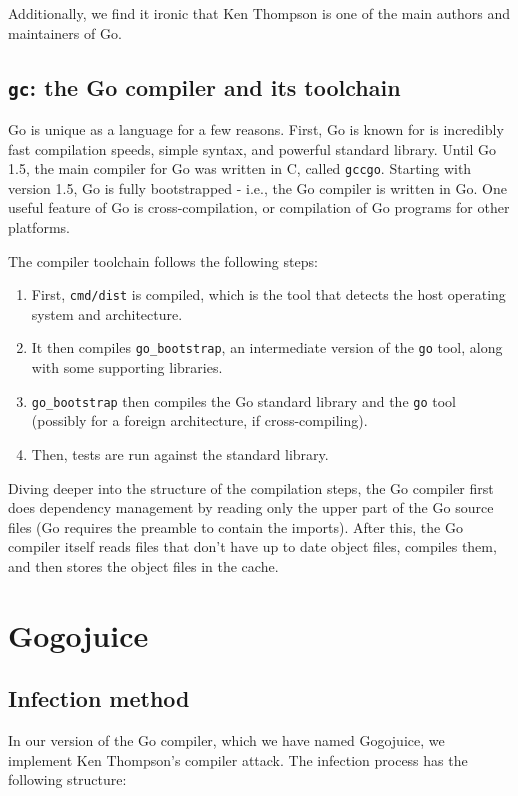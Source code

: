 \documentclass[10pt]{sigplanconf}
\begin{document}
Additionally, we find it ironic that Ken Thompson is one of the main authors and maintainers of Go.

\subsection{\texttt{gc}: the Go compiler and its toolchain}
Go is unique as a language for a few reasons. First, Go is known for is incredibly fast compilation speeds, simple syntax, and powerful standard library. Until Go 1.5, the main compiler for Go was written in C, called \texttt{gccgo}. Starting with version 1.5, Go is fully bootstrapped - i.e., the Go compiler is written in Go. One useful feature of Go is cross-compilation, or compilation of Go programs for other platforms. %

\smallskip
The compiler toolchain follows the following steps: 
\begin{enumerate}
	\item First, \texttt{cmd/dist} is compiled, which is the tool that detects the host operating system and architecture.
	\item It then compiles \texttt{go\_bootstrap}, an intermediate version of the \texttt{go} tool, along with some supporting libraries.
	\item \texttt{go\_bootstrap} then compiles the Go standard library and the \texttt{go} tool (possibly for a foreign architecture, if cross-compiling). 
	\item Then, tests are run against the standard library.  
\end{enumerate}

Diving deeper into the structure of the compilation steps, the Go compiler first does dependency management by reading only the upper part of the Go source files (Go requires the preamble to contain the imports). After this, the Go compiler itself reads files that don't have up to date object files, compiles them, and then stores the object files in the cache. 

\section{Gogojuice}

\subsection{Infection method}

In our version of the Go compiler, which we have named Gogojuice, we implement Ken Thompson's compiler attack. The infection process has the following structure:
\end{document}
